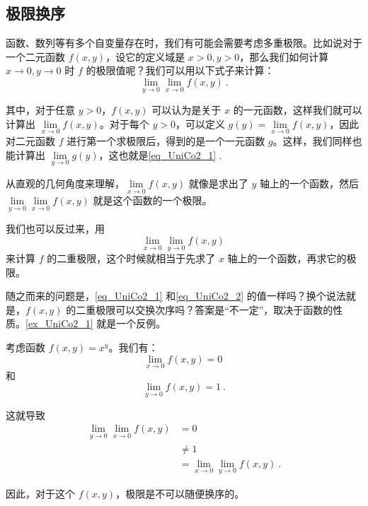 

\subsection{极限换序}

函数、数列等有多个自变量存在时，我们有可能会需要考虑多重极限。比如说对于一个二元函数 $f(x, y)$，设它的定义域是 $x>0, y>0$，那么我们如何计算 $x\to 0, y\to 0$ 时 $f$ 的极限值呢？我们可以用以下式子来计算：
\begin{equation}\label{eq_UniCo2_1}
\lim\limits_{y\to 0}\lim\limits_{x\to 0}f(x, y)~.
\end{equation}

其中，对于任意 $y>0$，$f(x, y)$ 可以认为是关于 $x$ 的一元函数，这样我们就可以计算出 $\lim\limits_{x\to 0}f(x, y)$。对于每个 $y>0$，可以定义 $g(y)=\lim\limits_{x\to 0}f(x, y)$，因此对二元函数 $f$ 进行第一个求极限后，得到的是一个一元函数 $g$。这样，我们同样也能计算出 $\lim\limits_{y\to 0}g(y)$，这也就是\autoref{eq_UniCo2_1} .

从直观的几何角度来理解，$\lim\limits_{x\to 0}f(x, y)$ 就像是求出了 $y$ 轴上的一个函数，然后 $\lim\limits_{y\to 0}\lim\limits_{x\to 0}f(x, y)$ 就是这个函数的一个极限。

我们也可以反过来，用
\begin{equation}\label{eq_UniCo2_2}
\lim\limits_{x\to 0}\lim\limits_{y\to 0}f(x, y)~
\end{equation}
来计算 $f$ 的二重极限，这个时候就相当于先求了 $x$ 轴上的一个函数，再求它的极限。

随之而来的问题是，\autoref{eq_UniCo2_1} 和\autoref{eq_UniCo2_2} 的值一样吗？换个说法就是，$f(x, y)$ 的二重极限可以交换次序吗？答案是“不一定”，取决于函数的性质。\autoref{ex_UniCo2_1} 就是一个反例。

\begin{example}{}\label{ex_UniCo2_1}
考虑函数 $f(x, y)=x^y$。我们有：
\begin{equation}
\lim\limits_{x\to 0}f(x, y)=0~
\end{equation}
和
\begin{equation}
\lim\limits_{y\to 0}f(x, y)=1~.
\end{equation}

这就导致
\begin{equation}
\begin{aligned}
\lim\limits_{y\to 0}\lim\limits_{x\to 0}f(x, y)&=0\\
&\not = 1\\
&=\lim\limits_{x\to 0}\lim\limits_{y\to 0}f(x, y)~.
\end{aligned}
\end{equation}

因此，对于这个 $f(x, y)$，极限是不可以随便换序的。

\end{example}



